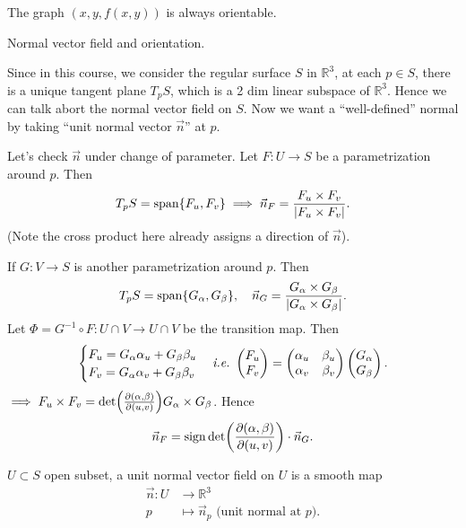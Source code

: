 \begin{example}
    The graph \((x,y,f(x,y))\) is always orientable.
\end{example}

\noindent\textbullet{} Normal vector field and orientation.

Since in this course, we consider the regular surface \(S\) in \(\mathbb{R}^3\),
at each \(p\in S\), there is a unique tangent plane \(T_p S\), which is a 2 dim
linear subspace of \(\mathbb{R}^3\). Hence we can talk abort the normal vector
field on \(S\). Now we want a ``well-defined'' normal by taking ``unit normal vector
\(\vec{n}\)'' at \(p\).

Let's check \(\vec{n}\) under change of parameter. Let \(F\colon U\to S\) be
a parametrization around \(p\). Then \[
    T_p S=\operatorname{span}\{F_u,F_v\}\implies\vec{n}_F=\frac{F_u\times F_v}{|F_u\times F_v|}
.\] (Note the cross product here already assigns a direction of \(\vec{n}\)).

If \(G\colon V\to S\) is another parametrization around \(p\). Then \[
    T_p S=\operatorname{span}\{G_\alpha,G_\beta\},\quad \vec{n}_G=\frac{G_\alpha\times G_\beta}
    {|G_\alpha\times G_\beta|}
.\] Let \(\Phi=G^{-1}\circ F\colon U\cap V\to U\cap V\) be the transition map.
Then \[
    \begin{cases}
        F_u=G_\alpha\alpha_u+G_\beta\beta_u \\
        F_v=G_\alpha\alpha_v+G_\beta\beta_v
    \end{cases}
    \text{\emph{i.e.}\ }
    \begin{pmatrix}
        F_u \\ F_v
    \end{pmatrix}=\begin{pmatrix}
        \alpha_u & \beta_u \\
        \alpha_v & \beta_v
    \end{pmatrix}\begin{pmatrix}
        G_\alpha \\ G_\beta
    \end{pmatrix}
.\]
\(\implies F_u\times F_v=\det(\pdv{(\alpha,\beta)}{(u,v)})G_\alpha\times G_\beta\).
Hence \[
    \vec{n}_F=\operatorname{sign} \det(\pdv{(\alpha,\beta)}{(u,v)})\cdot \vec{n}_G
.\] 

\begin{definition}
    \(U\subset S\) open subset, a unit normal vector field on \(U\) is a smooth map
    \begin{align*}
        \vec{n}\colon U &\longrightarrow \mathbb{R}^3 \\
        p &\longmapsto \vec{n}_p\text{ (unit normal at }p\text{)}
    .\end{align*}
\end{definition}

